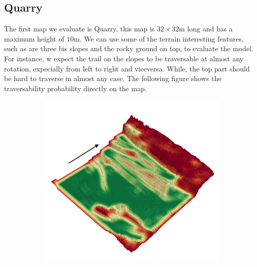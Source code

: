 \documentclass[../document.tex]{subfiles}
\begin{document}
\subsection{Quarry}
The first map we evaluate is Quarry, this map is $32\times 32$m long and has a maximum height of $10$m. We can use some of the terrain interesting features, such as are three bis slopes and the rocky ground on top, to evaluate the model. For instance, w expect the trail on the slopes to be traversable at almost any rotation, expecially from left to right and viceversa. While, the top part should be hard to traverse in almost any case. The following figure shows the traversability probability directly on the map. 
\begin{figure} [htbp]
\centering
\begin{subfigure}[b]{0.45\textwidth}
  \includegraphics[width=\linewidth]{../img/4/traversability/quarry/-270.png} 
\end{subfigure}
\begin{subfigure}[b]{0.45\textwidth}

\end{subfigure}
\end{figure}
\end{document}
